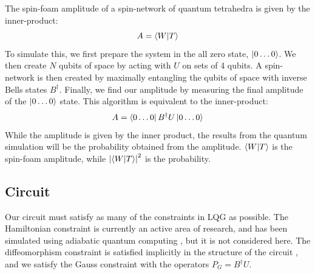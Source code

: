 \documentclass[a4paper,11pt,aps,tightenlines,nofootinbib]{revtex4}
\begin{document}
        The spin-foam amplitude of a spin-network of quantum tetrahedra is given by the inner-product: %
        \begin{equation}
                A = \bra{W}\ket{T}
        \end{equation}
        To simulate this, we first prepare the system in the all zero state, $\ket{0\dots 0}$. We then create $N$ qubits of space by acting with $U$ on sets of 4 qubits.
        A spin-network is then created by maximally entangling the qubits of space with inverse Bells states $B^\dagger$. Finally, we find our amplitude by measuring the 
        final amplitude of the $\ket{0\dots0} $ state. This algorithm is equivalent to the inner-product:
        \begin{equation}
                A = \bra{0\dots0}B^\dagger U\ket{0\dots0}
        \end{equation}
        While the amplitude is given by the inner product, the results from the quantum simulation will be the probability obtained from the amplitude. $\bra{W}\ket{T}$ is the spin-foam 
        amplitude, while $\abs{\bra{W}\ket{T}}^2$ is the probability. 


\subsection{Circuit}
        Our circuit must satisfy as many of the constraints in LQG as possible. The Hamiltonian constraint is currently an active area of research,
        and has been simulated using adiabatic quantum computing \cite{adiabatic}, but it is not considered here. The diffeomorphism constraint is satisfied implicitly in 
        the structure of the circuit \cite{ibm-qsim-qubit-of-space}, and we satisfy the Gauss constraint with the operators $P_G = B^\dagger U$.
\end{document}
